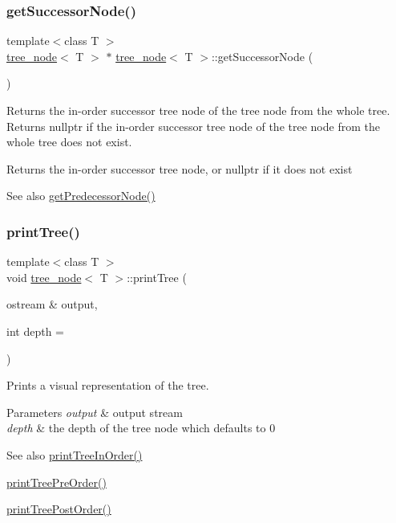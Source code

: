 \subsubsection{\texorpdfstring{get\+Successor\+Node()}{getSuccessorNode()}}
{\footnotesize\ttfamily template$<$class T $>$ \\
\hyperlink{classtree__node}{tree\+\_\+node}$<$ T $>$ $\ast$ \hyperlink{classtree__node}{tree\+\_\+node}$<$ T $>$\+::get\+Successor\+Node (\begin{DoxyParamCaption}{ }\end{DoxyParamCaption})}

Returns the in-\/order successor tree node of the tree node from the whole tree. Returns nullptr if the in-\/order successor tree node of the tree node from the whole tree does not exist. \begin{DoxyReturn}{Returns}
the in-\/order successor tree node, or nullptr if it does not exist 
\end{DoxyReturn}
\begin{DoxySeeAlso}{See also}
\hyperlink{classtree__node_a5cce6c37b00a6d899e371c334559310e}{get\+Predecessor\+Node()} 
\end{DoxySeeAlso}
\mbox{\label{classtree__node_a241608f3e979085651ccc8e77c816b58}} 
\subsubsection{\texorpdfstring{print\+Tree()}{printTree()}}
{\footnotesize\ttfamily template$<$class T $>$ \\
void \hyperlink{classtree__node}{tree\+\_\+node}$<$ T $>$\+::print\+Tree (\begin{DoxyParamCaption}\item[{ostream \&}]{output,  }\item[{int}]{depth = {} }\end{DoxyParamCaption})}

Prints a visual representation of the tree. 
\begin{DoxyParams}{Parameters}
{\em output} & output stream \\
\hline
{\em depth} & the depth of the tree node which defaults to 0 \\
\hline
\end{DoxyParams}
\begin{DoxySeeAlso}{See also}
\hyperlink{classtree__node_a06d05cc3d2201be12bbeea10190a923f}{print\+Tree\+In\+Order()} 

\hyperlink{classtree__node_af6b781b7c54d6ffa8fc3d8ddb15a184d}{print\+Tree\+Pre\+Order()} 

\hyperlink{classtree__node_a7a30637fff22c441f95e9e1b7cb34649}{print\+Tree\+Post\+Order()} 
\end{DoxySeeAlso}
\mbox{\label{classtree__node_a06d05cc3d2201be12bbeea10190a923f}} 
